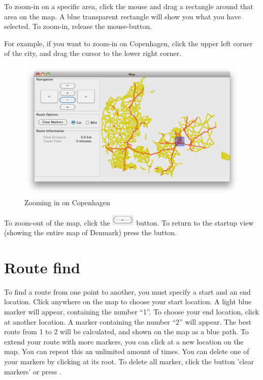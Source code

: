 To zoom-in on a specific area, click the mouse and drag a rectangle around that
area on the map. A blue transparent rectangle will show you what you have
selected. To zoom-in, release the mouse-button.

For example, if you want to zoom-in on Copenhagen,
click the upper left corner of the city, and drag the cursor to the lower right
corner.

\begin{figure}[h!]
\centering
\includegraphics[width=1\linewidth]{images/man-copenhagen.png}
\caption{Zooming in on Copenhagen}
\label{MAN-Z-COP}
\end{figure}

To zoom-out of the map, click the
\includegraphics[height=1.5em]{images/zoomoutbutton.png} button. To return to
the startup view (showing the entire map of Denmark) press the  button.

\section{Route find}
\label{MAN-RF}
To find a route from one point to another, you must specify a start and an end
location. Click anywhere on the map to choose your start location. A light blue
marker will appear, containing the number ``1''. To choose your end location,
click at another location. A marker containing the number ``2'' will appear. The
best route from 1 to 2 will be calculated, and shown on the map as a blue path.
To extend your route with more markers, you can click at a new location on the
map. You can repeat this an unlimited amount of times. You can delete one of
your markers by clicking at its root. To delete all marker, click the button
'clear markers' or press .

